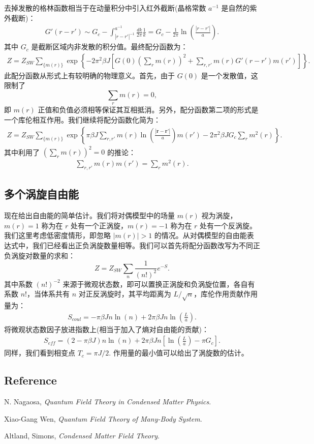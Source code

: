 \documentclass[10pt,UTF8]{ctexart}
\begin{document}
去掉发散的格林函数相当于在动量积分中引入红外截断(晶格常数 $a^{-1}$ 是自然的紫外截断)：
\begin{eqnarray}
	G'(r-r') \sim G_c-\int_{|r-r'|^{-1}}^{a^{-1}} \frac{dk}{2\pi} \frac{1}{k}
		= G_c-\frac{1}{2\pi} \ln\left(\frac{|r-r'|}{a}\right).
\end{eqnarray}
其中 $G_c$ 是截断区域内非发散的积分值。最终配分函数为：
\begin{eqnarray}
	Z = Z_{SW}\sum_{\{m(r)\}}\exp\left\{-2\pi^2\beta J \left[G(0)\left(\sum_r m(r)\right)^2+\sum_{r,r'} m(r)G'(r-r')m(r') \right]\right\}.
\end{eqnarray}
此配分函数从形式上有较明确的物理意义。首先，由于 $G(0)$ 是一个发散值，这限制了
\begin{equation}
	\sum_r m(r) = 0,
\end{equation}
即 $m(r)$ 正值和负值必须相等保证其互相抵消。另外，配分函数第二项的形式是一个库伦相互作用。我们继续将配分函数化简为：
\begin{eqnarray}
	Z = Z_{SW}\sum_{\{m(r)\}} \exp\left\{ \pi \beta J\sum_{r,r'} m(r)\ln\left(\frac{|\bm r-\bm r'|}{a}\right) m(r') -2\pi^2\beta J G_c \sum_{r} m^2(r) \right\}.
\end{eqnarray}
其中利用了 $(\sum_r m(r))^2 = 0$ 的推论：
\begin{eqnarray}
	\sum_{r,r'}m(r)m(r') = \sum_{r} m^2(r).
\end{eqnarray}

\subsection*{多个涡旋自由能}
\noindent
现在给出自由能的简单估计。我们将对偶模型中的场量 $m(r)$ 视为涡旋，$m(r)=1$ 称为在 $r$ 处有一个正涡旋，$m(r)=-1$ 称为在 $r$ 处有一个反涡旋。我们这里考虑低密度情形，即忽略 $|m(r)|>1$ 的情况。从对偶模型的自由能表达式中，我们已经看出正负涡旋数量相等。我们可以首先将配分函数改写为不同正负涡旋对数量的求和：
\begin{equation}
	Z = Z_{SW} \sum_n \frac{1}{(n!)^2} e^{-S}.
\end{equation}
其中系数 $(n!)^{-2}$ 来源于微观状态数，即可以置换正涡旋和负涡旋位置，各自有系数 $n!$，当体系共有 $n$ 对正反涡旋时，其平均距离为 $L/\sqrt n$，库伦作用贡献作用量为：
\begin{eqnarray}
	S_{coul} = -\pi \beta J n\ln(n) + 2\pi \beta J n\ln\left(\frac{L}{a} \right).
\end{eqnarray}
将微观状态数因子放进指数上(相当于加入了熵对自由能的贡献)：
\begin{eqnarray}
	S_{eff} = (2-\pi \beta J) n\ln(n) + 2\pi \beta J n \left[ \ln\left(\frac{L}{a} \right)-\pi G_c \right].
\end{eqnarray}
同样，我们看到相变点 $T_c = \pi J/2$. 作用量的最小值可以给出了涡旋数的估计。

\subsection*{Reference}
\noindent
[1] N. Nagaosa, \textit{Quantum Field Theory in Condensed Matter Physics}.

\noindent
[2] Xiao-Gang Wen, \textit{Quantum Field Theory of Many-Body System}.

\noindent
[3] Altland, Simons, \textit{Condensed Matter Field Theory}.
\end{document}
